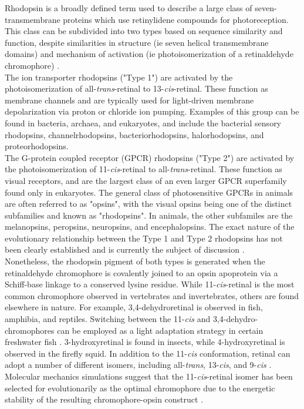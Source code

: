 \indent Rhodopsin is a broadly defined term used to describe a large class of seven-transmembrane proteins which use retinylidene compounds for photoreception. This class can be subdivided into two types based on sequence similarity and function, despite similarities in structure (ie seven helical transmembrane domains) and mechanism of activation (ie photoisomerization of a retinaldehyde chromophore) \cite{Spudich2000}.\\
\indent The ion transporter rhodopsins ("Type 1") are activated by the photoisomerization of all-\textit{trans}-retinal to 13-\textit{cis}-retinal. These function as membrane channels and are typically used for light-driven membrane depolarization via proton or chloride ion pumping. Examples of this group can be found in bacteria, archaea, and eukaryotes, and include the bacterial sensory rhodopsins, channelrhodopsins, bacteriorhodopsins, halorhodopsins, and proteorhodopsins.\\
\indent The G-protein coupled receptor (GPCR) rhodopsins ("Type 2") are activated by the photoisomerization of 11-\textit{cis}-retinal to all-\textit{trans}-retinal. These function as visual receptors, and are the largest class of an even larger GPCR superfamily found only in eukaryotes. The general class of photosensitive GPCRs in animals are often referred to as "opsins", with the visual opsins being one of the distinct subfamilies and known as "rhodopsins". In animals, the other subfamiles are the melanopsins, peropsins, neuropsins, and encephalopsins. The exact nature of the evolutionary relationship between the Type 1 and Type 2 rhodopsins has not been clearly established and is currently the subject of discussion \cite{Terakita2005,Shichida2009}.\\
\indent Nonetheless, the rhodopsin pigment of both types is generated when the retinaldehyde chromophore is covalently joined to an opsin apoprotein via a Schiff-base linkage to a conserved lysine residue. While 11-\textit{cis}-retinal is the most common chromophore observed in vertebrates and invertebrates, others are found elsewhere in nature. For example, 3,4-dehydroretinal is observed in fish, amphibia, and reptiles. Switching between the 11-\textit{cis} and 3,4-dehydro- chromophores can be employed as a light adaptation strategy in certain freshwater fish \cite{Shichida2009}. 3-hydroxyretinal is found in insects, while 4-hydroxyretinal is observed in the firefly squid. In addition to the 11-\textit{cis} conformation, retinal can adopt a number of different isomers, including all-\textit{trans}, 13-\textit{cis}, and 9-\textit{cis} \cite{Shichida2009}. Molecular mechanics simulations suggest that the 11-\textit{cis}-retinal isomer has been selected for evolutionarily as the optimal chromophore due to the energetic stability of the resulting chromophore-opsin construct \cite{Sekharan2011}.\\ 
